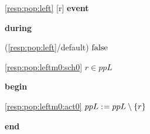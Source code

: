 \noindent \ref{resp:pop:left} [r] \textbf{event}
\begin{block}
  \item   \textbf{during}
  \begin{block}
  \item[ (\ref{resp:pop:left}/default) ]\sout{$\text{false} $} %
  \end{block}
  \begin{block}
  \item[ \eqref{resp:pop:leftm0:sch0} ]{$r \in ppL $} %
  \end{block}
  \item   \textbf{begin}
  \begin{block}
  \item[ \eqref{resp:pop:leftm0:act0} ]{$ppL \mathrel{:\mkern1mu=} ppL \setminus \{ r \} $} %
  \end{block}
  \item   \textbf{end} \\
\end{block}
